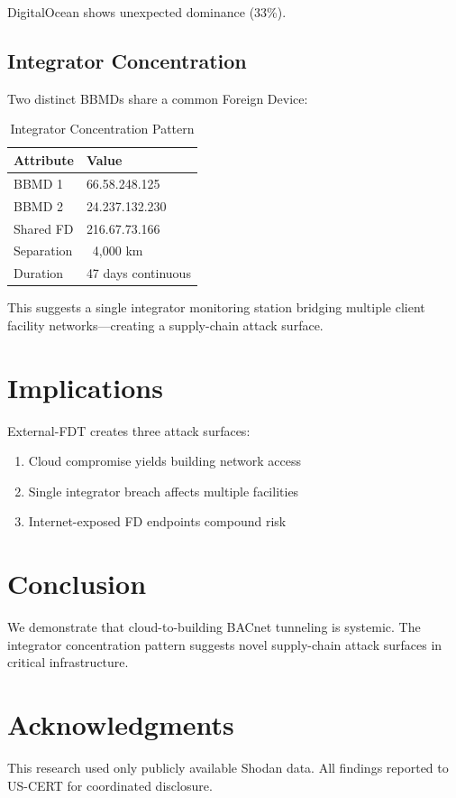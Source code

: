 \documentclass[11pt,a4paper]{article}
\begin{document}
DigitalOcean shows unexpected dominance (33\%).

\subsection{Integrator Concentration}

Two distinct BBMDs share a common Foreign Device:

\begin{table}[h]
\centering
\begin{tabular}{ll}
\toprule
\textbf{Attribute} & \textbf{Value} \\
\midrule
BBMD 1 & 66.58.248.125 \\
BBMD 2 & 24.237.132.230 \\
Shared FD & 216.67.73.166 \\
Separation & ~4,000 km \\
Duration & 47 days continuous \\
\bottomrule
\end{tabular}
\caption{Integrator Concentration Pattern}
\end{table}

This suggests a single integrator monitoring station bridging multiple 
client facility networks---creating a supply-chain attack surface.

\section{Implications}
\label{sec:implications}

External-FDT creates three attack surfaces:
\begin{enumerate}
  \item Cloud compromise yields building network access
  \item Single integrator breach affects multiple facilities
  \item Internet-exposed FD endpoints compound risk
\end{enumerate}

\section{Conclusion}

We demonstrate that cloud-to-building BACnet tunneling is systemic. The 
integrator concentration pattern suggests novel supply-chain attack surfaces 
in critical infrastructure.

\section*{Acknowledgments}

This research used only publicly available Shodan data. All findings 
reported to US-CERT for coordinated disclosure.
\end{document}
